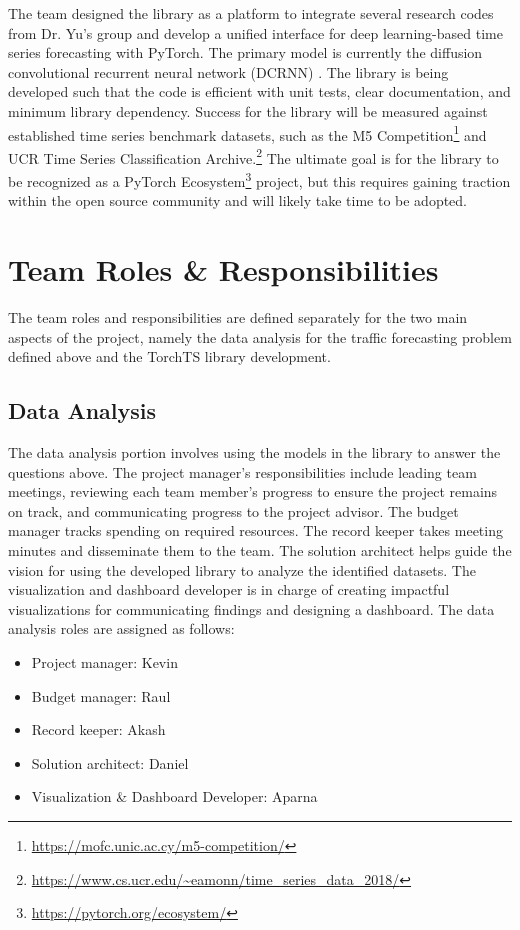 \documentclass{article}
\begin{document}
The team designed the library as a platform to integrate several research codes from Dr. Yu’s group and develop a unified interface for deep learning-based time series forecasting with PyTorch. The primary model is currently the diffusion convolutional recurrent neural network (DCRNN) \cite{li2018dcrnn_traffic}. The library is being developed such that the code is efficient with unit tests, clear documentation, and minimum library dependency. Success for the library will be measured against established time series benchmark datasets, such as the M5 Competition\footnote{\url{https://mofc.unic.ac.cy/m5-competition/}} and UCR Time Series Classification Archive.\footnote{\url{https://www.cs.ucr.edu/~eamonn/time_series_data_2018/}} The ultimate goal is for the library to be recognized as a PyTorch Ecosystem\footnote{\url{https://pytorch.org/ecosystem/}} project, but this requires gaining traction within the open source community and will likely take time to be adopted.

\section{Team Roles \& Responsibilities}

The team roles and responsibilities are defined separately for the two main aspects of the project, namely the data analysis for the traffic forecasting problem defined above and the TorchTS library development.

\subsection{Data Analysis}

The data analysis portion involves using the models in the library to answer the questions above. The project manager’s responsibilities include leading team meetings, reviewing each team member’s progress to ensure the project remains on track, and communicating progress to the project advisor. The budget manager tracks spending on required resources. The record keeper takes meeting minutes and disseminate them to the team. The solution architect helps guide the vision for using the developed library to analyze the identified datasets. The visualization and dashboard developer is in charge of creating impactful visualizations for communicating findings and designing a dashboard. The data analysis roles are assigned as follows:

\begin{itemize}
    \item Project manager: Kevin
    \item Budget manager: Raul
    \item Record keeper: Akash
    \item Solution architect: Daniel
    \item Visualization \& Dashboard Developer: Aparna
\end{itemize}
\end{document}
